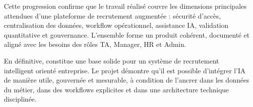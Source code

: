 Cette progression confirme que le travail réalisé couvre les dimensions principales attendues d'une plateforme de recrutement augmentée : sécurité d'accès, centralisation des données, workflow opérationnel, assistance IA, validation quantitative et gouvernance. L'ensemble forme un produit cohérent, documenté et aligné avec les besoins des rôles TA, Manager, HR et Admin.

En définitive, \projectname{} constitue une base solide pour un système de recrutement intelligent orienté entreprise. Le projet démontre qu'il est possible d'intégrer l'IA de manière utile, gouvernée et mesurable, à condition de l'ancrer dans les données du métier, dans des workflows explicites et dans une architecture technique disciplinée.

